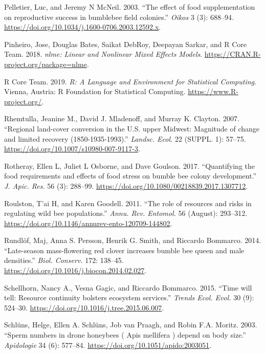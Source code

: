 \documentclass[11pt,]{article}
\begin{document}
\leavevmode\hypertarget{ref-Pelletier2003}{}%
Pelletier, Luc, and Jeremy N McNeil. 2003. ``The effect of food
supplementation on reproductive success in bumblebee field colonies.''
\emph{Oikos} 3 (3): 688--94.
\url{https://doi.org/10.1034/j.1600-0706.2003.12592.x}.

\leavevmode\hypertarget{ref-nlme}{}%
Pinheiro, Jose, Douglas Bates, Saikat DebRoy, Deepayan Sarkar, and R
Core Team. 2018. \emph{nlme: Linear and Nonlinear Mixed Effects Models}.
\url{https://CRAN.R-project.org/package=nlme}.

\leavevmode\hypertarget{ref-rcite}{}%
R Core Team. 2019. \emph{R: A Language and Environment for Statistical
Computing}. Vienna, Austria: R Foundation for Statistical Computing.
\url{https://www.R-project.org/}.

\leavevmode\hypertarget{ref-Rhemtulla2007}{}%
Rhemtulla, Jeanine M., David J. Mladenoff, and Murray K. Clayton. 2007.
``Regional land-cover conversion in the U.S. upper Midwest: Magnitude of
change and limited recovery (1850-1935-1993).'' \emph{Landsc. Ecol.} 22
(SUPPL. 1): 57--75. \url{https://doi.org/10.1007/s10980-007-9117-3}.

\leavevmode\hypertarget{ref-Rotheray2017}{}%
Rotheray, Ellen L, Juliet L Osborne, and Dave Goulson. 2017.
``Quantifying the food requirements and effects of food stress on bumble
bee colony development.'' \emph{J. Apic. Res.} 56 (3): 288--99.
\url{https://doi.org/10.1080/00218839.2017.1307712}.

\leavevmode\hypertarget{ref-Roulston2011}{}%
Roulston, T'ai H, and Karen Goodell. 2011. ``The role of resources and
risks in regulating wild bee populations.'' \emph{Annu. Rev. Entomol.}
56 (August): 293--312.
\url{https://doi.org/10.1146/annurev-ento-120709-144802}.

\leavevmode\hypertarget{ref-Rundlof2014}{}%
Rundlöf, Maj, Anna S. Persson, Henrik G. Smith, and Riccardo Bommarco.
2014. ``Late-season mass-flowering red clover increases bumble bee queen
and male densities.'' \emph{Biol. Conserv.} 172: 138--45.
\url{https://doi.org/10.1016/j.biocon.2014.02.027}.

\leavevmode\hypertarget{ref-Schellhorn2015c}{}%
Schellhorn, Nancy A., Vesna Gagic, and Riccardo Bommarco. 2015. ``Time
will tell: Resource continuity bolsters ecosystem services.''
\emph{Trends Ecol. Evol.} 30 (9): 524--30.
\url{https://doi.org/10.1016/j.tree.2015.06.007}.

\leavevmode\hypertarget{ref-Schluns2003}{}%
Schlüns, Helge, Ellen A. Schlüns, Job van Praagh, and Robin F.A. Moritz.
2003. ``Sperm numbers in drone honeybees ( Apis mellifera ) depend on
body size.'' \emph{Apidologie} 34 (6): 577--84.
\url{https://doi.org/10.1051/apido:2003051}.
\end{document}
